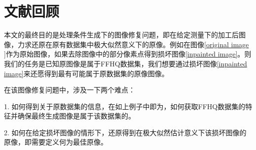 \chapter{文献回顾}
本文的最终目的是处理条件生成下的图像修复问题，即在给定测量下的加工后图像，力求还原在原有数据集中极大似然意义下的原像。例如在图像\ref{original image }作为原始图像，如果去除图像中的部分像素点得到损坏图像\ref{inpainted image}。则我们的任务是已知原图像是属于FFHQ数据集，我们想要通过损坏图像\ref{inpainted image}来还愿得到最有可能属于原数据集的原像图像。    

在该图像修复问题中，涉及一下两个难点：     

1. 如何得到关于原数据集的信息，在如上例子中即为，如何获取FFHQ数据集的特征并确保最终生成图像是属于该数据集的。   

2. 如何在给定损坏图像的情形下，还原得到在极大似然估计意义下该损坏图像的原像，即需要定义何为最佳原像。    

